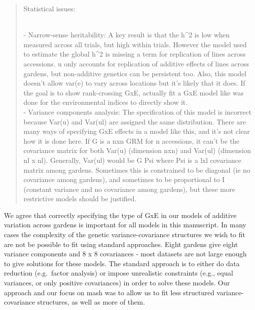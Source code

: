 \documentclass[
  letterpaper,
  DIV=11,
  numbers=noendperiod]{scrartcl}
\begin{document}
\begin{quote}
\begin{tcolorbox}[enhanced jigsaw, rightrule=.15mm, colframe=quarto-callout-warning-color-frame, leftrule=.75mm, arc=.35mm, colback=white, opacityback=0, left=2mm, breakable, toprule=.15mm, bottomrule=.15mm]

Statistical issues:\\
\strut \\
- Narrow-sense heritability: A key result is that the h\^{}2 is low when
measured across all trials, but high within trials. However the model
used to estimate the global h\^{}2 is missing a term for replication of
lines across accessions. u only accounts for replication of additive
effects of lines across gardens, but non-additive genetics can be
persistent too. Also, this model doesn't allow var(e) to vary across
locations but it's likely that it does. If the goal is to show
rank-crossing GxE, actually fit a GxE model like was done for the
environmental indices to directly show it.\\
- Variance components analysis: The specification of this model is
incorrect because Var(u) and Var(ul) are assigned the same distribution.
There are many ways of specifying GxE effects in a model like this, and
it's not clear how it is done here. If G is a nxn GRM for n accessions,
it can't be the covariance matrix for both Var(u) (dimension nxn) and
Var(ul) (dimension nl x nl). Generally, Var(ul) would be G \otimes Psi
where Psi is a lxl covariance matrix among gardens. Sometimes this is
constrained to be diagonal (ie no covariance among gardens), and
sometimes to be proportional to I (constant variance and no covariance
among gardens), but these more restrictive models should be justified.

\end{tcolorbox}
\end{quote}

We agree that correctly specifying the type of GxE in our models of
additive variation across gardens is important for all models in this
manuscript. In many cases the complexity of the genetic
variance-covariance structures we wish to fit are not be possible to fit
using standard approaches. Eight gardens give eight variance components
and 8 x 8 covariances - most datasets are not large enough to give
solutions for these models. The standard approach is to either do data
reduction (e.g.~factor analysis) or impose unrealistic constraints
(e.g., equal variances, or only positive covariances) in order to solve
these models. Our approach and our focus on mash was to allow us to fit
less structured variance-covariance structures, as well as more of them.
\end{document}

